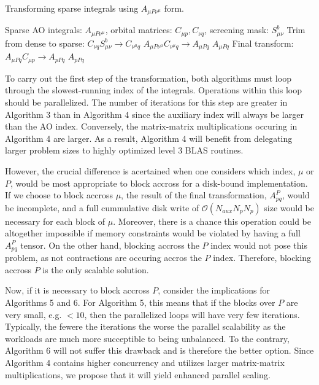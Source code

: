 \begin{algorithm}[H]
\caption{Transforming sparse integrals using $A_{\mu P \nu^\mu}$ form.}
\begin{algorithmic}
\REQUIRE Sparse AO integrals: $A_{\mu P \nu^\mu}$, orbital matrices: $C_{\mu p}, C_{\nu q}$, screening mask: $S_{\mu \nu}^b$
    \STATE Trim from dense to sparse: $C_{\nu q}S_{\mu \nu}^b \rightarrow C_{\nu^{\mu} q}$
    \STATE $A_{\mu P \nu^{\mu}} C_{\nu^{\mu} q} \rightarrow A_{\mu Pq}$
\ENDFOR
\RETURN $A_{\mu P q}$
\STATE Final transform: $A_{\mu P q}C_{\mu p} \rightarrow A_{p P q}$
\RETURN $A_{p P q}$
\end{algorithmic}
\end{algorithm}


To carry out the first step of the transformation, both algorithms must loop through the slowest-running index of the integrals.
Operations within this loop should be parallelized.
The number of iterations for this step are greater in Algorithm 3 than in Algorithm 4 since the auxiliary index will always be 
larger than the AO index.
Conversely, the matrix-matrix multiplications occuring in Algorithm 4 are larger. As a result, Algorithm 4 will benefit from delegating
larger problem sizes to highly optimized level 3 BLAS routines. 

However, the crucial difference is acertained when one considers which index, $\mu$ or $P$, would be most appropriate to block accross
for a disk-bound implementation. If we choose to block accross $\mu$, the result of the final transformation, $A_{pq}^P$, would be incomplete,
and a full cummulative disk write of $\mathcal{O}(N_{aux}N_pN_p)$ size would be necessary for each block of $\mu$. Moreover, there is a chance
this operation could be altogether impossible if memory constraints would be violated by having a full $A_{pq}^P$ tensor. On the other hand, 
blocking accross the $P$ index would not pose this problem, as not contractions are occuring accros the $P$ index. Therefore, blocking accross 
$P$ is the only scalable solution.

Now, if it is necessary to block accross $P$, consider the implications for Algorithms 5 and 6. For Algorithm 5, this means that if the blocks
over $P$ are very small, e.g. $<10$, then the parallelized loops will have very few iterations. Typically, the fewere the iterations the worse
the parallel scalability as the workloads are much more succeptible to being unbalanced. To the contrary, Algorithm 6 will not suffer this 
drawback and is therefore the better option. Since Algorithm 4 contains higher concurrency and utilizes larger matrix-matrix multiplications, 
we propose that it will yield enhanced parallel scaling.  

